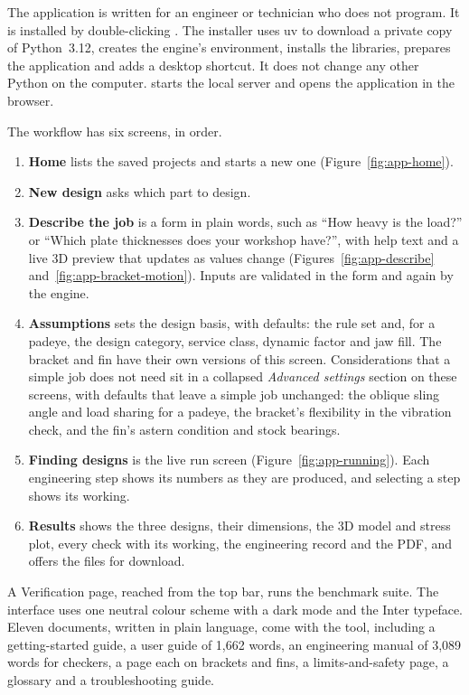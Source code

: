 The application is written for an engineer or technician who does not
program. It is installed by double-clicking . The
installer uses uv to download a private copy of Python~3.12, creates the
engine's environment, installs the libraries, prepares the application and
adds a desktop shortcut. It does not change any other Python on the computer.
 starts the local server and opens the application in the
browser.

The workflow has six screens, in order.

\begin{enumerate}
    \item \textbf{Home} lists the saved projects and starts a new one
    (Figure~\ref{fig:app-home}).
    \item \textbf{New design} asks which part to design.
    \item \textbf{Describe the job} is a form in plain words, such as ``How
    heavy is the load?'' or ``Which plate thicknesses does your workshop
    have?'', with help text and a live 3D preview that updates as values
    change (Figures~\ref{fig:app-describe} and~\ref{fig:app-bracket-motion}). Inputs are validated in the form
    and again by the engine.
    \item \textbf{Assumptions} sets the design basis, with defaults: the rule
    set and, for a padeye, the design category, service class, dynamic factor
    and jaw fill. The bracket and fin have their own versions of this screen.
    Considerations that a simple job does not need sit in a collapsed
    \emph{Advanced settings} section on these screens, with defaults that
    leave a simple job unchanged: the oblique sling angle and load sharing for
    a padeye, the bracket's flexibility in the vibration check, and the fin's
    astern condition and stock bearings.
    \item \textbf{Finding designs} is the live run screen
    (Figure~\ref{fig:app-running}). Each engineering step shows its numbers as
    they are produced, and selecting a step shows its working.
    \item \textbf{Results} shows the three designs, their dimensions, the 3D
    model and stress plot, every check with its working, the engineering
    record and the PDF, and offers the files for download.
\end{enumerate}

A Verification page, reached from the top bar, runs the benchmark suite.
The interface uses one neutral colour scheme with a dark mode and the Inter
typeface. Eleven documents, written in plain language, come with the tool,
including a getting-started guide, a user guide of 1,662 words, an
engineering manual of 3,089 words for checkers, a page each on brackets and
fins, a limits-and-safety page, a glossary and a troubleshooting guide.

